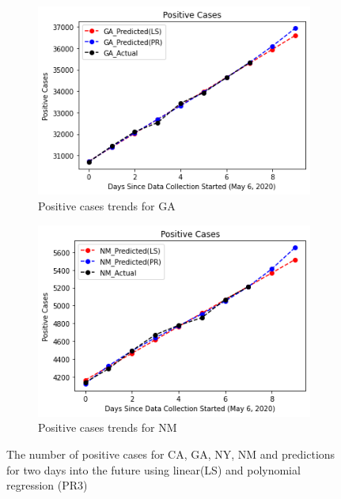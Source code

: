 \documentclass[11pt]{article}
\begin{document}
\begin{figure}[h]
\begin{subfigure}[b]{0.49\textwidth}
         \includegraphics[width=\textwidth]{diagrams/analysis/positive_trend_GA.png}
         \caption{Positive cases trends for GA}
     \end{subfigure}
     \begin{subfigure}[b]{0.49\textwidth}
         \centering
         \includegraphics[width=\textwidth]{diagrams/analysis/positive_trend_NM.png}
         \caption{Positive cases trends for NM}
         \label{fig:three sin x}
     \end{subfigure}
        \caption{The number of positive cases for CA, GA, NY, NM and predictions for two days into the future using linear(LS) and polynomial regression (PR3)}
        \label{fig:pos_trends}

\end{figure}
\FloatBarrier
\end{document}
